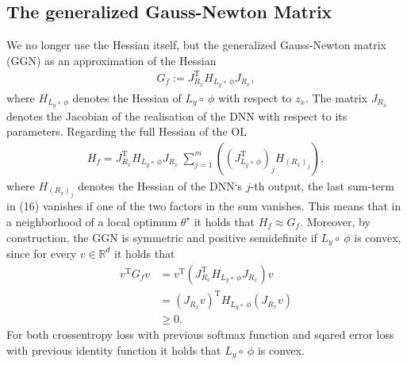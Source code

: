 \documentclass[conference]{IEEEtran}
\begin{document}
\subsection{The generalized Gauss-Newton Matrix}
\noindent
We no longer use the Hessian itself, but the generalized Gauss-Newton matrix (GGN) as an approximation of the Hessian
\begin{align}
G_{f} := J_{R_{x}}^{\mathrm{T}}H_{L_{y}\circ\:\phi}J_{R_{x}},
\end{align}
where $H_{L_{y}\circ\:\phi}$ denotes the Hessian of $L_{y}\circ\:\phi$ with respect to $z_{x}$. The matrix $J_{R_{x}}$ denotes the Jacobian of the realisation of the DNN with respect to its parameters.
Regarding the full Hessian of the OL
\begin{align}
H_{f} = J_{R_{x}}^{\mathrm{T}}H_{L_{y}\circ\:\phi}J_{R_{x}}\:\sum_{j = 1}^{m}\left(\left(J_{L_{y}\circ \:\phi}^{\mathrm{T}}\right)_{j} H_{(R_{x})_{j}}\right),
\end{align}
where $H_{(R_{x})_{j}}$ denotes the Hessian of the DNN`s  $j$-th output, the last sum-term in (16) vanishes if one of the two factors in the sum vanishes.
This means that in a neighborhood of a local optimum $\theta^{\star}$ it holds that $H_{f} \approx G_{f}$.   Moreover, by construction, the GGN is symmetric and positive semidefinite if $L_{y}\circ\:\phi$ is convex, since for every $v\in\mathbb{R}^{d}$ it holds that
\begin{align}
v^{\mathrm{T}}G_{f}v &= v^{\mathrm{T}}\left( J_{R_{x}}^{\mathrm{T}}H_{L_{y}\circ\:\phi}J_{R_{x}}\right)v\\
&= \left(J_{R_{x}}v\right)^{\mathrm{T}}H_{L_{y}\circ\:\phi}\left(J_{R_{x}}v\right) \\
&\geq 0.
\end{align}
For both crossentropy loss with previous softmax function and sqared error loss with previous identity function it holds that $L_{y}\circ\:\phi$ is convex.
\end{document}
